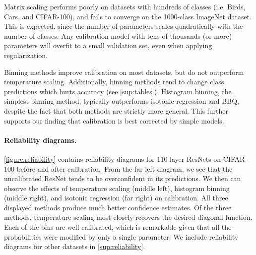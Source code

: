 
Matrix scaling performs poorly on datasets with hundreds of classes (i.e. Birds, Cars, and CIFAR-100), and fails to converge on the 1000-class ImageNet dataset.
This is expected, since the number of parameters scales quadratically with the number of classes.
Any calibration model with tens of thousands (or more) parameters will overfit to a small validation set, even when applying regularization.

Binning methods improve calibration on most datasets, but do not outperform temperature scaling. Additionally, binning methods tend to change class predictions which hurts accuracy (see \autoref{sup:tables}). Histogram binning, the simplest binning method, typically outperforms isotonic regression and BBQ, despite the fact that both methods are strictly more general. This further supports our finding that calibration is best corrected by simple models.

\paragraph{Reliability diagrams.} \autoref{figure.reliability} contains reliability diagrams for 110-layer ResNets on CIFAR-100 before and after calibration. From the far left diagram, we see that the uncalibrated ResNet tends to be overconfident in its predictions. We then can observe the effects of temperature scaling (middle left), histogram binning (middle right), and isotonic regression (far right) on calibration. All three displayed methods produce much better confidence estimates. Of the three methods, temperature scaling most closely recovers the desired diagonal function. Each of the bins are well calibrated, which is remarkable given that all the probabilities were modified by only a single parameter. We include reliability diagrams for other datasets in \autoref{sup:reliability}.

